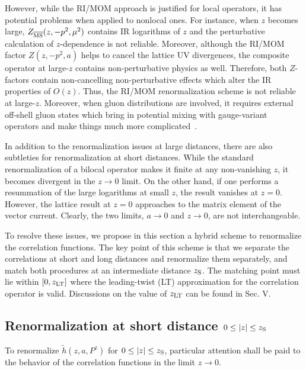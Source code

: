 However, while the RI/MOM approach is justified
for local operators, it has potential problems when
applied to nonlocal ones.
For instance, when $z$ becomes large,
$Z_{\overline{\rm MS}}(z,-p^2,\mu^2)$ contains IR
logarithms of $z$ and the perturbative calculation
of $z$-dependence is not reliable. Moreover,
although the RI/MOM factor $Z(z,-p^2,a)$ helps to cancel
the lattice UV divergences, the composite operator
at large-$z$ contains non-perturbative physics as well.
Therefore, both $Z$-factors contain non-cancelling
non-perturbative effects which alter the IR properties
of $O(z)$. Thus, the RI/MOM renormalization scheme is not reliable
at large-$z$. Moreover, when gluon distributions
are involved, it requires external off-shell gluon states which
bring in potential mixing with gauge-variant operators and make things much more complicated~\cite{Wang:2019tgg}.

In addition to the renormalization issues at large distances, there are also
subtleties for renormalization at short distances. While the standard renormalization
of a bilocal operator makes it finite at any non-vanishing
$z$, it becomes divergent in the $z\to 0$ limit. On the other hand, if one performs a resummation of the large
logarithms at small $z$, the result vanishes at $z=0$. However, the lattice
result at $z=0$ approaches to the matrix element of the vector current.
Clearly, the two limits, $a\to 0$ and $z\to 0$,
are not interchangeable.

To resolve these issues, we propose in this section a
hybrid scheme to renormalize the correlation functions. The key point of this scheme is that we separate the correlations
at short and long distances and renormalize them separately, and match both procedures
at an intermediate distance $z_{\rm S}$. The
matching point must lie within $[0,z_{\rm LT}]$ where
the leading-twist (LT) approximation for the correlation
operator is valid. Discussions on the value of
$z_{\rm LT}$ can be found in Sec. V.

\subsection{Renormalization at short distance $0\le |z|\le z_{\rm S}$}
\label{sec:short}

To renormalize $\tilde h(z,a, P^z)$ for $0\le |z|\le z_{\rm S}$, particular attention shall be paid to the behavior of the correlation functions in the limit $z\to 0$.

